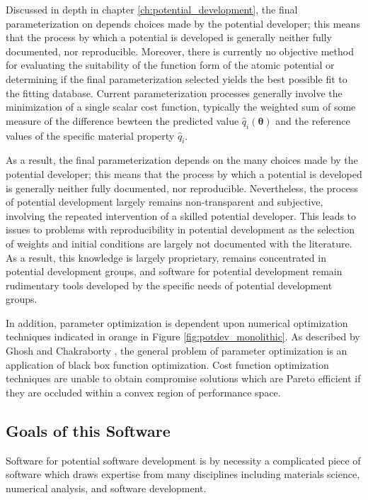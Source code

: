 Discussed in depth in chapter \ref{ch:potential_development}, the final parameterization on depends choices made by the potential developer; this means that the process by which a potential is developed is generally neither fully documented, nor reproducible.  Moreover, there is currently no objective method for evaluating the suitability of the function form of the atomic potential or determining if the final parameterization selected yields the best possible fit to the fitting database.  Current parameterization processes generally involve the minimization of a single scalar cost function, typically the weighted sum of some measure of the difference bewteen the predicted value $\hat{q}_i(\bm{\theta})$ and the reference values of the specific material property $\hat{q}_i$.

As a result, the final parameterization depends on the many choices made by the potential developer; this means that the process by which a potential is developed is generally neither fully documented, nor reproducible.  Nevertheless, the process of potential development largely remains non-transparent and subjective\cite{martinez2013_fitting,martinez2016_posmat}, involving the repeated intervention of a skilled potential developer\cite{brenner2000_fitting}.
This leads to issues to problems with reproducibility in potential development as the selection of weights and initial conditions are largely not documented with the literature.
As a result, this knowledge is largely proprietary, remains concentrated in potential development groups, and software for potential development remain rudimentary tools developed by the specific needs of potential development groups.

In addition, parameter optimization is dependent upon numerical optimization techniques indicated in orange in Figure \ref{fig:potdev_monolithic}.  As described by Ghosh and Chakraborty \cite{ghosh2014_potdev_pareto}, the general problem of parameter optimization is an application of black box function optimization.  Cost function optimization techniques are unable to obtain compromise solutions which are Pareto efficient if they are occluded within a convex region of performance space.

\subsection{Goals of this Software}

Software for potential software development is by necessity a complicated piece of software which draws expertise from many disciplines including materials science, numerical analysis, and software development.

